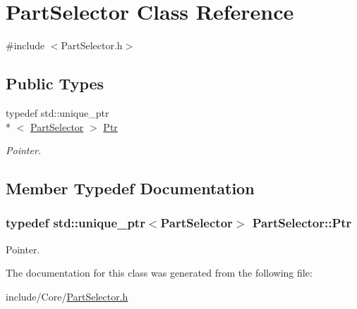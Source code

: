 \hypertarget{class_part_selector}{\section{Part\-Selector Class Reference}
\label{class_part_selector}
}


{\ttfamily \#include $<$Part\-Selector.\-h$>$}

\subsection*{Public Types}
\begin{DoxyCompactItemize}
\item 
typedef std\-::unique\-\_\-ptr\\*
$<$ \hyperlink{class_part_selector}{Part\-Selector} $>$ \hyperlink{class_part_selector_a4fcdf24aa0af46b18de0bc5fde066e81}{Ptr}
\begin{DoxyCompactList}\small\item\em Pointer. \end{DoxyCompactList}\end{DoxyCompactItemize}


\subsection{Member Typedef Documentation}
\hypertarget{class_part_selector_a4fcdf24aa0af46b18de0bc5fde066e81}{
\subsubsection[{Ptr}]{\setlength{\rightskip}{0pt plus 5cm}typedef std\-::unique\-\_\-ptr$<${\bf Part\-Selector}$>$ {\bf Part\-Selector\-::\-Ptr}}}\label{class_part_selector_a4fcdf24aa0af46b18de0bc5fde066e81}


Pointer. 



The documentation for this class was generated from the following file\-:\begin{DoxyCompactItemize}
\item 
include/\-Core/\hyperlink{_part_selector_8h}{Part\-Selector.\-h}\end{DoxyCompactItemize}

